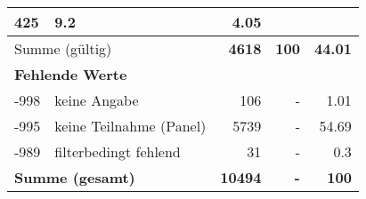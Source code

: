\begin{longtable}{lXrrr}
       \num{425} &
       \num[round-mode=places,round-precision=2]{9.2} &
         \num[round-mode=places,round-precision=2]{4.05} \\
     \midrule
     \multicolumn{2}{l}{Summe (gültig)} &
       \textbf{\num{4618}} &
     \textbf{\num{100}} &
       \textbf{\num[round-mode=places,round-precision=2]{44.01}} \\
     \multicolumn{5}{l}{\textbf{Fehlende Werte}}\\
       -998 &
       keine Angabe &
         \num{106} &
        - &
         \num[round-mode=places,round-precision=2]{1.01} \\
       -995 &
       keine Teilnahme (Panel) &
         \num{5739} &
        - &
         \num[round-mode=places,round-precision=2]{54.69} \\
       -989 &
       filterbedingt fehlend &
         \num{31} &
        - &
         \num[round-mode=places,round-precision=2]{0.3} \\
     \midrule
     \multicolumn{2}{l}{\textbf{Summe (gesamt)}} &
          \textbf{\num{10494}} &
        \textbf{-} &
        \textbf{\num{100}} \\
     \bottomrule
     \end{longtable}
     
